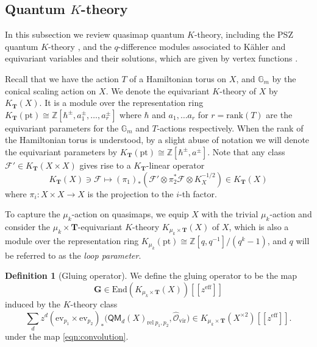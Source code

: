 \documentclass[reqno]{amsart}
\numberwithin{equation}{section}
\numberwithin{equation}{section}
\numberwithin{equation}{section}
\theoremstyle{definition}
\newtheorem{defn}[thm]{Definition}
\theoremstyle{remark}
\theoremstyle{remark}
\begin{document}
\subsection{Quantum $K$-theory}\label{ssec:oper-quantumK}
In this subsection we review quasimap quantum $K$-theory, including the PSZ quantum $K$-theory \cite{PSZ-quantum}, and the $q$-difference modules associated to K\"ahler and equivariant variables and their solutions, which are given by vertex functions \cite{Oko17}.

Recall that we have the action $T$ of a Hamiltonian torus on $X$, and $\mathbb{G}_m$ by the conical scaling action on $X$. We denote the equivariant $K$-theory of $X$ by $K_{\mathbf{T}}(X)$. It is a module over the representation ring $K_\mathbf{T}(\mathrm{pt}) \cong \mathbb{Z}[\hbar^\pm , a_1^\pm, \dots, a_r^\pm]$ where $\hbar$ and $a_1, \dots a_r$ for $ r= \mathrm{rank}(T)$ are the equivariant parameters for the $\mathbb{G}_m$ and $T$-actions respectively. When the rank of the Hamiltonian torus is understood, by a slight abuse of notation we will denote the equivariant parameters by $K_\mathbf{T}(\mathrm{pt}) \cong \mathbb{Z}[\hbar^\pm, a^\pm]$. Note that any class $\mathcal{F}' \in K_{\mathbf{T}}(X \times X)$ gives rise to a $K_{\mathbf{T}}$-linear operator
\begin{equation}\label{eqn:convolution}
    K_{\mathbf{T}}(X) \ni \mathcal{F} \mapsto (\pi_1)_{*}(\mathcal{F}' \otimes \pi_2^*\mathcal{F}\otimes K_X^{-1/2}) \in K_{\mathbf{T}}(X)
\end{equation}
where $\pi_i: X \times X \to X$ is the projection to the $i$-th factor.

To capture the $\mu_k$-action on quasimaps, we equip $X$ with the trivial $\mu_k$-action and consider the $\mu_k \times \mathbf{T}$-equivariant $K$-theory $K_{\mu_k \times \mathbf{T}}(X)$ of $X$, which is also a module over the representation ring $K_{\mu_k}(\mathrm{pt}) \cong \mathbb{Z}[q,q^{-1}]/(q^k - 1)$, and $q$ will be referred to as the \emph{loop parameter}.

\begin{defn}[Gluing operator]
We define the gluing operator to be the map
\begin{equation}
    \mathbf{G} \in \mathrm{End}(K_{\mu_k \times \mathbf{T}}(X))[\![ z^{\mathrm{eff}} ]\!]
\end{equation}
induced by the $K$-theory class
\begin{equation}
    \sum_d z^d (\mathrm{ev}_{p_1} \times \mathrm{ev}_{p_2})_* \big(\mathsf{QM}_d(X)_{\mathrm{rel} \  p_1, p_2}, \hat{\mathcal{O}}_{\mathrm{vir}}\big) \in K_{\mu_k \times \mathbf{T}}(X^{\times 2})[\![ z^{\mathrm{eff}} ]\!].
\end{equation}
under the map \eqref{eqn:convolution}.
\end{defn}
\end{document}
